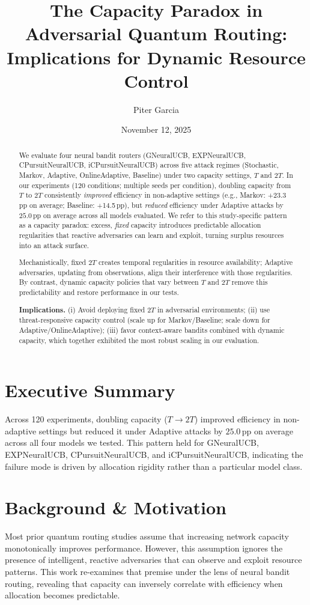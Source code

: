 \documentclass[11pt,a4paper]{article}
\title{The Capacity Paradox in Adversarial Quantum Routing: Implications for Dynamic Resource Control}
\author{Piter Garcia}
\date{November 12, 2025}
\begin{document}
\maketitle
\begin{abstract}
We evaluate four neural bandit routers (GNeuralUCB, EXPNeuralUCB, CPursuitNeuralUCB, iCPursuitNeuralUCB) across five attack regimes (Stochastic, Markov, Adaptive, OnlineAdaptive, Baseline) under two capacity settings, $T$ and $2T$. In our experiments (120 conditions; multiple seeds per condition), doubling capacity from $T$ to $2T$ consistently \emph{improved} efficiency in non-adaptive settings (e.g., Markov: +23.3\,pp on average; Baseline: +14.5\,pp), but \emph{reduced} efficiency under Adaptive attacks by $25.0$\,pp on average across all models evaluated. We refer to this study-specific pattern as a capacity paradox: excess, \emph{fixed} capacity introduces predictable allocation regularities that reactive adversaries can learn and exploit, turning surplus resources into an attack surface.

Mechanistically, fixed $2T$ creates temporal regularities in resource availability; Adaptive adversaries, updating from observations, align their interference with those regularities. By contrast, dynamic capacity policies that vary between $T$ and $2T$ remove this predictability and restore performance in our tests.

\textbf{Implications.} (i) Avoid deploying fixed $2T$ in adversarial environments; (ii) use threat-responsive capacity control (scale up for Markov/Baseline; scale down for Adaptive/OnlineAdaptive); (iii) favor context-aware bandits combined with dynamic capacity, which together exhibited the most robust scaling in our evaluation.
\end{abstract}

{\small\tableofcontents}

\section{Executive Summary}
Across 120 experiments, doubling capacity ($T\!\to\!2T$) improved efficiency in non-adaptive settings but reduced it under Adaptive attacks by $25.0$\,pp on average across all four models we tested. This pattern held for GNeuralUCB, EXPNeuralUCB, CPursuitNeuralUCB, and iCPursuitNeuralUCB, indicating the failure mode is driven by allocation rigidity rather than a particular model class.

\section{Background \& Motivation}
Most prior quantum routing studies assume that increasing network capacity monotonically improves performance. However, this assumption ignores the presence of intelligent, reactive adversaries that can observe and exploit resource patterns. This work re-examines that premise under the lens of neural bandit routing, revealing that capacity can inversely correlate with efficiency when allocation becomes predictable.
\end{document}
